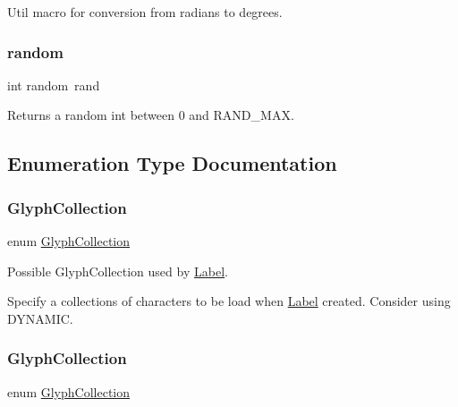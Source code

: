Util macro for conversion from radians to degrees. \mbox{\label{group__base_gae4ebe0d1812bb378ab3531d81d9856b8}} 
\subsubsection{\texorpdfstring{random}{random}}
{\footnotesize\ttfamily int random~rand\hspace{0.3cm}{\ttfamily [inline]}}

Returns a random int between 0 and R\+A\+N\+D\+\_\+\+M\+AX. 

\subsection{Enumeration Type Documentation}
\mbox{\label{group__base_gac5e83e2fc436edc7833f2bcabad984f3}} 
\subsubsection{\texorpdfstring{Glyph\+Collection}{GlyphCollection}\hspace{0.1cm}{\footnotesize\ttfamily [1/2]}}
{\footnotesize\ttfamily enum \hyperlink{group__base_gac5e83e2fc436edc7833f2bcabad984f3}{Glyph\+Collection}\hspace{0.3cm}{\ttfamily [strong]}}



Possible Glyph\+Collection used by \hyperlink{classLabel}{Label}. 

Specify a collections of characters to be load when \hyperlink{classLabel}{Label} created. Consider using D\+Y\+N\+A\+M\+IC. \mbox{\label{group__base_gac5e83e2fc436edc7833f2bcabad984f3}} 
\subsubsection{\texorpdfstring{Glyph\+Collection}{GlyphCollection}\hspace{0.1cm}{\footnotesize\ttfamily [2/2]}}
{\footnotesize\ttfamily enum \hyperlink{group__base_gac5e83e2fc436edc7833f2bcabad984f3}{Glyph\+Collection}\hspace{0.3cm}{\ttfamily [strong]}}



